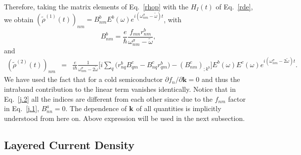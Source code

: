 \documentclass[floatfix,prb,aps,superscriptaddress,11pt,preprint,letterpaper]{revtex4}
\begin{document}
Therefore,
taking the matrix elements of Eq.~\eqref{rhop} with the $H_{I}(t)$ of
Eq.~\eqref{rde}, we obtain 
$(\tilde{\rho}^{(1)}(t))_{nm}=B_{nm}^{b}E^{b}(\omega)e^{i(\omega^\sigma_{nm}-\tilde\omega)t}$,
with 
\begin{equation}\label{j.1}
B_{nm}^{b}=\frac{e}{\hbar }\frac{f_{mn}r_{nm}^{b}}{\omega^\sigma_{nm}-\tilde\omega},
\end{equation}
and 
\begin{eqnarray}\label{j.2}
(\tilde{\rho}^{(2)}(t))_{nm} &=&\frac{e}{i\hbar }\frac{1}{\omega^\sigma_{nm}-2\tilde\omega}\bigg[
i\sum_{q }\Big(r_{nq }^{b}B_{q m}^{c}-B_{nq}^{c}r_{q m}^{b}
\Big)  
-(B_{nm}^{c})_{;k^{b}}\bigg]E^{b}(\omega)E^{c}(\omega)e^{i(\omega^\sigma_{nm}-2\tilde\omega)t}
.
\end{eqnarray}
We have used the fact that for a cold semiconductor $\partial
f_{n}/\partial \mathbf{k}=0$ and thus the intraband contribution to the linear
term vanishes identically. 
Notice that in Eq.~\eqref{j.2} all the indices are different from each
other since due to the $f_{nm}$ factor in Eq.~\eqref{j.1},
$B^a_{nn}=0$. The dependence of $\mathbf{k}$ of all quantities is implicitly understood from
here on. 
Above expression will be used in the next subsection.

\subsection{Layered Current Density}\label{cd}

\end{document}
